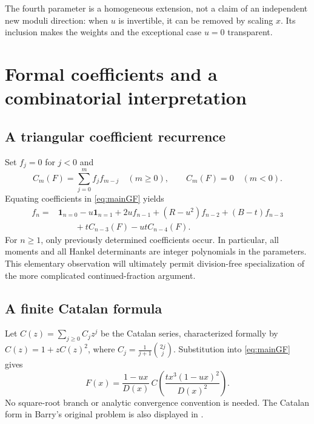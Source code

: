 \documentclass[11pt,a4paper]{article}
\numberwithin{equation}{section}
\theoremstyle{definition}
\begin{document}
The fourth parameter is a homogeneous extension, not a claim of an
independent new moduli direction: when $u$ is invertible, it can be removed
by scaling $x$. Its inclusion makes the weights and the exceptional case
$u=0$ transparent.

\section{Formal coefficients and a combinatorial interpretation}

\subsection{A triangular coefficient recurrence}
Set $f_j=0$ for $j<0$ and
\[
 C_m(F)=\sum_{j=0}^{m}f_jf_{m-j}\quad(m\geq0),\qquad C_m(F)=0\quad(m<0).
\]
Equating coefficients in \eqref{eq:mainGF} yields
\begin{equation}\label{eq:momrec}
 \begin{split}
 f_n={}&\mathbf1_{n=0}-u\mathbf1_{n=1}+2uf_{n-1}
 +(R-u^2)f_{n-2}+(B-t)f_{n-3}\\
 &\hspace{2em}+tC_{n-3}(F)-utC_{n-4}(F).
 \end{split}
\end{equation}
For $n\geq1$, only previously determined coefficients occur. In particular,
all moments and all Hankel determinants are integer polynomials in the
parameters. This elementary observation will ultimately permit division-free
specialization of the more complicated continued-fraction argument.

\subsection{A finite Catalan formula}
Let $C(z)=\sum_{j\geq0}C_jz^j$ be the Catalan series, characterized formally by
$C(z)=1+zC(z)^2$, where $C_j=\frac{1}{j+1}\binom{2j}{j}$. Substitution into
\eqref{eq:mainGF} gives
\begin{equation}\label{eq:catalanF}
 F(x)=\frac{1-ux}{D(x)}\,
 C\!\left(\frac{tx^3(1-ux)^2}{D(x)^2}\right).
\end{equation}
No square-root branch or analytic convergence convention is needed. The
Catalan form in Barry's original problem is also displayed in
\cite[Conjecture 7]{Barry2022}.
\end{document}
